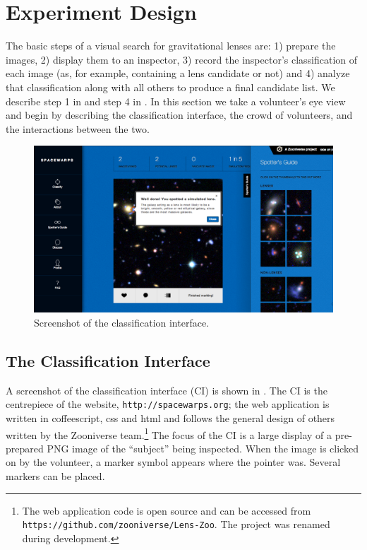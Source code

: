 \documentclass[useAMS,usenatbib,a4paper]{mn2e}
\begin{document}

\section{Experiment Design}
\label{sec:design}

The basic steps of a visual search for gravitational lenses are: 1) prepare
the images, 2) display them to an inspector, 3) record the inspector's
classification of each image (as, for example, containing a lens candidate or
not) and 4) analyze that classification along with all others to produce a
final candidate list. We describe step 1 in  and step 4 in
. In this section we take a volunteer's eye view and begin by
describing the \SW classification interface, the crowd of volunteers, and the
interactions between the two.

\begin{figure}
\centering\includegraphics[width=0.9\linewidth]{sw-system-figs/sw-screengrab-marker+feedback.png}
\caption{Screenshot of the \SW classification interface.}
\label{fig:screenshot}
\end{figure}


\subsection{The Classification Interface}
\label{sec:design:interface}

A screenshot of the \SW classification interface (CI) is shown in
. The CI is the centrepiece of the \SW website,
\texttt{http://spacewarps.org}; the web application is written in coffeescript,
css and html and follows the general design of others written by the Zooniverse
team.\footnote{The \SW web application code is open source and can be accessed
from \texttt{https://github.com/zooniverse/Lens-Zoo}. The project was renamed during development.}
The focus of the CI is a
large display of a pre-prepared PNG image of the ``subject'' being inspected.
When the image is clicked on by the volunteer, a marker symbol appears where the
pointer was. Several markers can be placed.
\end{document}
